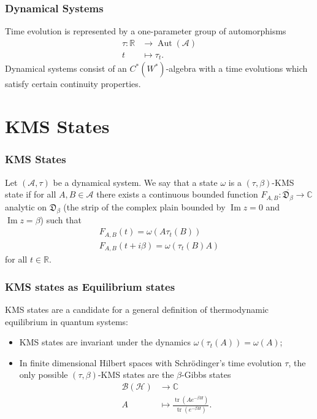 \documentclass{beamer}
\DeclareMathOperator{\tr}{tr}
\DeclareMathOperator{\Aut}{Aut}
\DeclareMathOperator{\im}{Im}
\begin{document}
\begin{frame}
	\frametitle{Dynamical Systems}
	Time evolution is represented by a one-parameter group of automorphisms
	\begin{align*}
		\tau:\mathbb{R}&\rightarrow\Aut(\mathcal{A}) \\
		t&\mapsto\tau_t.
	\end{align*}
	Dynamical systems consist of an $C^*(W^*)$-algebra with a time evolutions which satisfy certain continuity properties.
\end{frame}

\section{KMS States}

\begin{frame}
	\frametitle{KMS States}
	\begin{definition}
		Let $(\mathcal{A},\tau)$ be a dynamical system. We say that a state $\omega$ is a $(\tau,\beta)$-KMS state if for all $A,B\in\mathcal{A}$ there exists a continuous bounded function $F_{A,B}:\overline{\mathfrak{D}_\beta}\rightarrow\mathbb{C}$ analytic on $\mathfrak{D}_\beta$ (the strip of the complex plain bounded by $\im z = 0$ and $\im z = \beta$) such that
		\begin{align*}
			F_{A,B}(t)=\omega(A\tau_t(B)) \\
			F_{A,B}(t+i\beta)=\omega(\tau_t(B)A)
		\end{align*}		 
		for all $t\in\mathbb{R}$.
	\end{definition}
\end{frame}

\begin{frame}
	\frametitle{KMS states as Equilibrium states}	
	KMS states are a candidate for a general definition of thermodynamic equilibrium in quantum systems\cite{Haag1992}\cite{Duvenhage1999}:
	\begin{itemize}
		\item KMS states are invariant under the dynamics $\omega(\tau_t(A))=\omega(A)$;
		\item In finite dimensional Hilbert spaces with Schrödinger's time evolution $\tau$, the only possible $(\tau,\beta)$-KMS states are the $\beta$-Gibbs states
		\begin{align*}
			\mathcal{B}(\mathcal{H})&\rightarrow\mathbb{C} \\
			A&\mapsto \frac{\tr(Ae^{-\beta H})}{\tr(e^{-\beta H})}.
		\end{align*}
	\end{itemize}
\end{frame}
\end{document}
